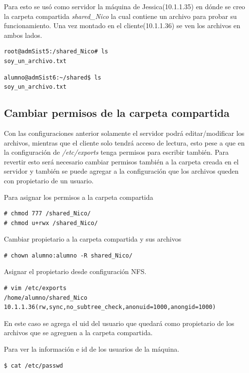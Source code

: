 \documentclass[12pt]{article}
\begin{document}
Para esto se usó como servidor la máquina de Jessica(10.1.1.35) en dónde se creo la carpeta compartida \emph{shared\_Nico} la cual contiene un archivo para probar su funcionamiento. Una vez montado en el cliente(10.1.1.36) se ven los archivos en ambos lados.
\bigskip
\begin{lstlisting}[frame=single]
root@admSist5:/shared_Nico# ls
soy_un_archivo.txt
\end{lstlisting}

\begin{lstlisting}[frame=single]
alumno@admSist6:~/shared$ ls
soy_un_archivo.txt
\end{lstlisting}

\subsection{Cambiar permisos de la carpeta compartida}

Con las configuraciones anterior solamente el servidor podrá editar/modificar los archivos, mientras que el cliente solo tendrá acceso de lectura, esto pese a que en la configuración de \emph{/etc/exports} tenga permisos para escribir también. Para revertir esto será necesario cambiar permisos también a la carpeta creada en el servidor y también se puede agregar a la configuración que los archivos queden con propietario de un usuario.

Para asignar los permisos a la carpeta compartida
\begin{lstlisting}[frame=single]
# chmod 777 /shared_Nico/
# chmod u+rwx /shared_Nico/
\end{lstlisting}

Cambiar propietario a la carpeta compartida y sus archivos 
\begin{lstlisting}[frame=single]
# chown alumno:alumno -R shared_Nico/
\end{lstlisting}

Asignar el propietario desde configuración NFS.
\begin{lstlisting}[frame=single]
# vim /etc/exports
/home/alumno/shared_Nico 10.1.1.36(rw,sync,no_subtree_check,anonuid=1000,anongid=1000)
\end{lstlisting}
En este caso se agrega el uid del usuario que quedará como propietario de los archivos que se agreguen a la carpeta compartida.

Para ver la información e id de los usuarios de la máquina.
\begin{lstlisting}[frame=single]
$ cat /etc/passwd
\end{lstlisting}
\end{document}
